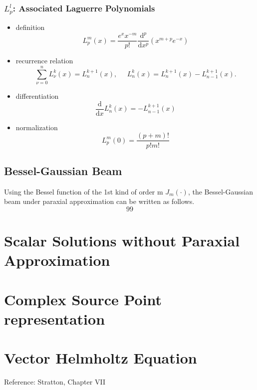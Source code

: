 \documentclass[11pt,letterpaper]{article}
\newcommand{\diff}{\mathrm{d}}
\begin{document}
\subsubsection*{ $L^l_p$: Associated Laguerre Polynomials}
\begin{itemize}
\item definition \[ L^m_p(x)= \frac{e^x x^{-m}}{p!}\frac{\diff^p}{\diff x^p}(x^{m+p}e^{-x}) \]
\item recurrence relation
 \[ \sum\limits_{\nu=0}^{n}L_{\nu}^k(x)=L_n^{k+1}(x),
\;\;\;\;\;
 L_n^k(x)=L_n^{k+1}(x)-L_{n-1}^{k+1}(x).  \] 
\item differentiation 
 \[ \frac{\diff}{\diff x}L_n^k(x) =-L_{n-1}^{k+1}(x)\] 
\item normalization \[L^{m}_{p}(0)=\frac{(p+m)!}{p!m!} \]
\end{itemize}    
\clearpage
\subsection{Bessel-Gaussian Beam}
Using the Bessel function of the 1st kind of order m $J_m(\cdot)$, the Bessel-Gaussian beam under paraxial approximation can be written as follows. 
\begin{equation}
99
\end{equation}
\section{Scalar Solutions without Paraxial Approximation}
\section{Complex Source Point representation}

\section{Vector Helmholtz Equation}
Reference: Stratton, Chapter VII
\end{document}

